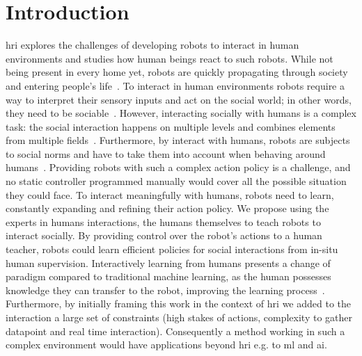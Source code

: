 \chapter{Introduction} \label{chap:intro}
\graphicspath{{images/intro/}}
\glsresetall


\gls{hri} explores the challenges of developing robots to interact in human environments and studies how human beings react to such robots. While not being present in every home yet, robots are quickly propagating through society and entering people's life~\citep{friedman2003hardware,forlizzi2006service}.
To interact in human environments robots require a way to interpret their sensory inputs and act on the social world; in other words, they need to be sociable~\citep{breazeal2004designing}. However, interacting socially with humans is a complex task: the social interaction happens on multiple levels and combines elements from multiple fields~\citep{fong2003survey}. Furthermore, by interact with humans, robots are subjects to social norms and have to take them into account when behaving around humans~\citep{bartneck2004design}. Providing robots with such a complex action policy is a challenge, and no static controller programmed manually would cover all the possible situation they could face. To interact meaningfully with humans, robots need to learn, constantly expanding and refining their action policy. We propose using the experts in humans interactions, the humans themselves to teach robots to interact socially. By providing control over the robot's actions to a human teacher, robots could learn efficient policies for social interactions from in-situ human supervision. Interactively learning from humans presents a change of paradigm compared to traditional machine learning, as the human possesses knowledge they can transfer to the robot, improving the learning process~\citep{fails2003interactive,amershi2014power}. Furthermore, by initially framing this work in the context of \gls{hri} we added to the interaction a large set of constraints (high stakes of actions, complexity to gather datapoint and real time interaction). Consequently a method working in such a complex environment would have applications beyond \gls{hri} e.g. to \gls{ml} and \gls{ai}.


